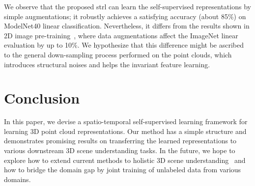 \documentclass[10pt,twocolumn,letterpaper]{article}
\begin{document}
We observe that the proposed \ac{strl} can learn the self-supervised representations by simple augmentations; it robustly achieves a satisfying accuracy (about 85\%) on ModelNet40 linear classification. Nevertheless, it differs from the results shown in 2D image pre-training~\cite{chen2020simple,grill2020bootstrap}, where data augmentations affect the ImageNet linear evaluation by up to 10\%. We hypothesize that this difference might be ascribed to the general down-sampling process performed on the point clouds, which introduces structural noises and helps the invariant feature learning.

\section{Conclusion}

In this paper, we devise a spatio-temporal self-supervised learning framework for learning 3D point cloud representations. Our method has a simple structure and demonstrates promising results on transferring the learned representations to various downstream 3D scene understanding tasks. In the future, we hope to explore how to extend current methods to holistic 3D scene understanding~\cite{huang2018holistic,huang2018cooperative,huang2019perspectivenet,chen2019holistic++,jia2020lemma,qi2018human,jiang2018configurable} and how to bridge the domain gap by joint training of unlabeled data from various domains.

{
\small
\balance


}
\end{document}

